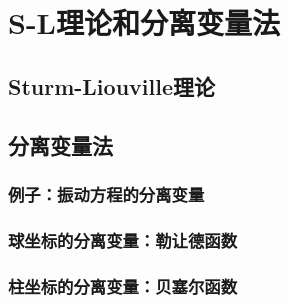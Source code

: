 \chapter{S-L理论和分离变量法}
\section{Sturm-Liouville理论}
\section{分离变量法}
\subsection{例子：振动方程的分离变量}
\subsection{球坐标的分离变量：勒让德函数}
\subsection{柱坐标的分离变量：贝塞尔函数}
